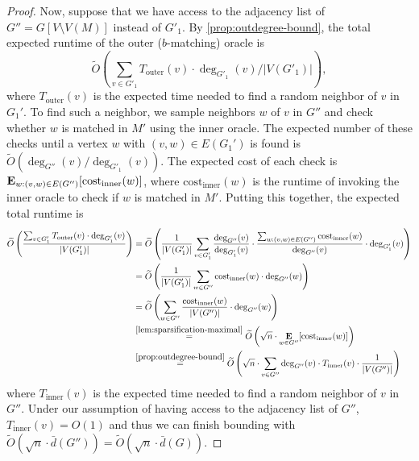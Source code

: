 \documentclass[letterpaper,11pt]{article}
\DeclareMathOperator{\E}{\ensuremath{\normalfont \textbf{E}}}
\newcommand{\wt}[1]{\ensuremath{\widetilde{#1}}}
\newcommand{\Touter}{\ensuremath{T_{\mathrm{outer}}}}
\newcommand{\Tinner}{\ensuremath{T_{\mathrm{inner}}}}
\newcommand{\costinner}{\ensuremath{\mathrm{cost}_{\mathrm{inner}}}}
\begin{document}
\begin{proof}
    Now, suppose that we have access to the adjacency list of $G'' = G[V \setminus V(M)]$ instead of $G'_1$. By \cref{prop:outdegree-bound},
    the total expected runtime of the outer ($b$-matching) oracle is
    $$\wt{O}\left( \sum_{v \in G'_1} \Touter(v) \cdot \deg_{G'_1}(v) / |V(G'_1)|\right),$$
    where $\Touter(v)$ is the expected time needed to find a random neighbor of $v$ in $G_1'$.
    To find such a neighbor, we sample neighbors $w$ of $v$ in $G''$
    and check whether $w$ is matched in $M'$ using the inner oracle.
    The expected number of these checks until a vertex $w$ with $(v,w) \in E(G_1')$ is found is $\wt{O}(\deg_{G''}(v)/\deg_{G'_1}(v))$.
    The expected cost of each check is $\E_{w : (v,w) \in E(G'')}[\costinner(w)]$,
    where $\costinner(w)$ is the runtime of invoking the inner oracle to check if $w$ is matched in $M'$.
    Putting this together, the expected total runtime is
    \begin{align*}
        \wt{O}\left(\frac{\sum_{v \in G'_1} \Touter(v) \cdot \deg_{G'_1}(v)}{|V(G'_1)|} \right)
        &=
        \wt{O}\left(\frac{1}{|V(G'_1)|} \sum_{v \in G'_1} \frac{\deg_{G''}(v)}{\deg_{G'_1}(v)} \cdot \frac{\sum_{w : (v,w) \in E(G'')}\costinner(w)}{\deg_{G''}(v)} \cdot \deg_{G'_1}(v)\right)
        \\
        &=
        \wt{O}\left(\frac{1}{|V(G'_1)|} \sum_{w \in G''} \costinner(w) \cdot \deg_{G''}(w)\right)
        \\
        &=
        \wt{O}\left(\sum_{w \in G''} \frac{\costinner(w)}{|V(G'')|} \cdot \deg_{G''}(w)\right)
        \\
        &\stackrel{\Cref{lem:sparsification-maximal}}{=}
        \wt{O}\left(\sqrt{n} \cdot \E_{w \in G''} [\costinner(w)]\right)
        \\
        &\stackrel{\Cref{prop:outdegree-bound}}{=}
        \wt{O}\left(\sqrt{n} \cdot \sum_{v \in G''} \deg_{G''}(v) \cdot \Tinner(v) \cdot \frac{1}{|V(G'')|}\right)
    \end{align*}
    where $\Tinner(v)$ is the expected time needed to find a random neighbor of $v$ in $G''$.
    Under our assumption of having access to the adjacency list of $G''$, $\Tinner(v) = O(1)$
    and thus we can finish bounding with $\wt{O}(\sqrt{n} \cdot \bar{d}(G'')) = \wt{O}(\sqrt{n} \cdot \bar{d}(G))$.


\end{proof}
\end{document}
